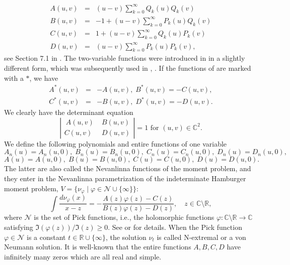 \documentclass[12pt]{article}
\newcommand{\C}{\mathbb{C}}
\newcommand{\R}{\mathbb{R}}
\def\C{\mathbb{C}}
\def\R{\mathbb{R}}
\begin{document}
\begin{eqnarray}
A(u,v)&=&(u-v)\sum_{k=0}^\infty Q_k(u)Q_k(v)\label{eq:A}\\
B(u,v)&=&-1+(u-v)\sum_{k=0}^\infty P_k(u)Q_k(v) \label{eq:B}\\
C(u,v)&=&1+(u-v)\sum_{k=0}^\infty Q_k(u)P_k(v)\label{eq:C}\\
D(u,v)&=&(u-v)\sum_{k=0}^\infty P_k(u)P_k(v)\label{eq:D},
\end{eqnarray}
see Section 7.1 in \cite{Sch}. The two-variable  functions were introduced in \cite{Bu:Ca} in a slightly different form, which was subsequently  used in \cite{B}, \cite{Pe}.
If the functions of \cite{Bu:Ca} are marked with a $*$, we have
\begin{eqnarray*}\label{eq:A*-D*}
A^*(u,v)&=&-A(u,v),\; B^*(u,v)=-C(u,v),\\
C^*(u,v)&=&-B(u,v),\; D^*(u,v)=-D(u,v).
\end{eqnarray*}
We clearly have the determinant equation
\begin{equation*}\label{eq:det5}
\left|\begin{array}{cc}\ A(u,v)&\;B(u,v)\\
 C(u,v)&\; D(u,v)\end{array}\right|=1\textrm{ for }(u,v)\in\mathbb
C^2.
\end{equation*}
We  define the following polynomials and entire functions of one variable
\begin{equation}\label{eq:pol-one}
A_n(u)=A_n(u,0),\;B_n(u)=B_n(u,0),\;C_n(u)=C_n(u,0),\;D_n(u)=D_n(u,0),
\end{equation}
\begin{equation}\label{eq:Nev-one}
A(u)=A(u,0),\;B(u)=B(u,0),\;C(u)=C(u,0),\;D(u)=D(u,0).
\end{equation}
The latter are also called the Nevanlinna functions of the moment problem, and they enter in the Nevanlinna parametrization of the indeterminate Hamburger moment problem, $V=\{\nu_\varphi\mid \varphi\in\mathcal N\cup\{\infty\}\}$:
\begin{equation}\label{eq:Nev-par}
\int\frac{d\nu_\varphi(x)}{x-z}=-\frac{A(z)\varphi(z)-C(z)}{B(z)\varphi(z)-D(z)},\quad z\in\C\setminus\R,
\end{equation}
where $\mathcal N$ is the set of Pick functions, i.e., the  holomorphic functions $\varphi:\C\setminus\R\to\C$ satisfying $\Im(\varphi(z))/\Im(z)\ge 0$.  See \cite{Ak} or \cite{B:V} for details. When the Pick function $\varphi\in\mathcal N$ is a constant $t\in\R\cup\{\infty\}$, the solution $\nu_t$ is called N-extremal or a von Neumann solution.
It is well-known that the entire functions $A, B, C, D$ have infinitely many zeros  which are all real and simple.
\end{document}
